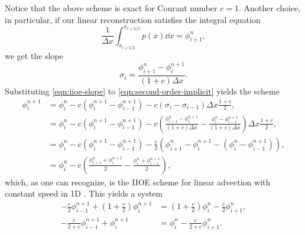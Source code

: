 \documentclass[../thesis.tex]{subfiles}
\begin{document}
Notice that the above scheme is exact for Courant number \(c = 1\).
Another choice, in particular, if our linear reconstruction satisfies the integral equation
\begin{equation}
    \frac{1}{\Delta x}
    \int_{x_{i+1/2}}^{x_{i+3/2}}
    p(x)\dd{x}
    = \phi_{i+1}^{n},
\end{equation}
we get the slope
\begin{equation}
    \label{eqn:iioe-slope}
    \sigma_{i} = \frac{\phi_{i+1}^{n} - \phi_{i}^{n+1}}{(1+c)\Delta x}.
\end{equation}
Substituting \eqref{eqn:iioe-slope} to \eqref{eqn:second-order-implicit} yields the scheme
\begin{equation}\label{eqn:iioe-1d}
    \begin{split}
        \phi_{i}^{n+1}
        &= \phi_{i}^{n} - c\left(
            \phi_{i}^{n+1}
            - \phi_{i-1}^{n+1}
            \right)
            -c\left(
            \sigma_{i} - \sigma_{i-1}
            \right)\Delta x\frac{1+c}{2},
        \\
        &= \phi_{i}^{n} - c\left(
            \phi_{i}^{n+1}
            - \phi_{i-1}^{n+1}
            \right)
            -c\left(
                \frac{\phi_{i+1}^{n} - \phi_{i}^{n+1}}{(1+c)\Delta x}
                - \frac{\phi_{i}^{n} - \phi_{i-1}^{n+1}}{(1+c)\Delta x}
            \right)\Delta x\frac{1+c}{2},
        \\
        &= \phi_{i}^{n} - c\left(
            \phi_{i}^{n+1}
            - \phi_{i-1}^{n+1}
            \right)
            -\frac{c}{2}\left(
                \phi_{i+1}^{n} - \phi_{i}^{n+1}
                - (\phi_{i}^{n} - \phi_{i-1}^{n+1})
            \right),
        \\
        &= \phi_{i}^{n}
            -c\left(
                \frac{\phi_{i+1}^{n} + \phi_{i}^{n+1}}{2}
                - \frac{\phi_{i}^{n} + \phi_{i-1}^{n+1}}{2}
            \right),
    \end{split}
\end{equation}
which, as one can recognize, is the IIOE scheme for linear advection with constant speed in 1D \cite{2014_Mikula,2018_Frolkovic,2020_Ibolya_CONF}.
This yields a system
\begin{equation}
    \label{eqn:iioe-system}
    \begin{split}
        -\frac{c}{2}\phi_{i-1}^{n+1}
        +\left( 1 + \frac{c}{2} \right)
        \phi_{i}^{n+1}
        &=
        \left( 1 + \frac{c}{2} \right)
        \phi_{i}^{n}
        -\frac{c}{2}\phi_{i+1}^{n},
        \\
        -\frac{c}{2+c}\phi_{i-1}^{n+1}
        +\phi_{i}^{n+1}
        &=
        \phi_{i}^{n}
        -\frac{c}{2+c}\phi_{i+1}^{n}.
    \end{split}
\end{equation}
\end{document}
